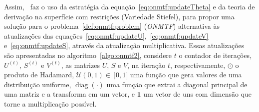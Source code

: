 \documentclass[
    12pt,                %
    oneside,            %
    a4paper,            %
    english,            %
    brazil                %
    ]{abntex2ppgsi}
\DeclareMathOperator*{\diag}{diag}
\begin{document}






Assim,~ faz o uso da estratégia da equação~\ref{eq:onmtf:updateTheta} e da teoria de derivação na superfície com restrições (Variedade Stiefel), para propor uma solução para o problema~\ref{def:onmtf:problem} (\textit{ONMTF}) alternativa às atualizações das equações~\ref{eq:onmtf:updateU},~\ref{eq:onmtf:updateV} e~\ref{eq:onmtf:updateS}, através da atualização multiplicativa.
Essas atualizações são apresentadas no algoritmo~\ref{algo:onmtf2}, considere $t$ o contador de iterações, $U^{(t)}$, $S^{(t)}$ e $V^{(t)}$, as matrizes $U$, $S$ e $V$, na iteração $t$, respectivamente, $\odot$ o produto de Hadamard, $\mathcal{U}(0, 1) \in~]0, 1]$ uma função que gera valores de uma distribuição uniforme, $\diag( \cdot )$ uma função que extrai a diagonal principal de uma matriz e a transforma em um vetor, e $\mathbf{1}$ um vetor de uns com dimensão que torne a multiplicação possível.
\end{document}
